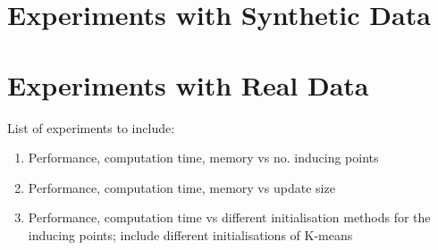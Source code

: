 \section{Experiments with Synthetic Data}\label{sec:synth}
\section{Experiments with Real Data}\label{sec:real}

List of experiments to include:
\begin{enumerate}
\item Performance, computation time, memory vs no. inducing points
\item Performance, computation time, memory vs update size
\item Performance, computation time vs different initialisation methods for the inducing points; include different initialisations of K-means
\end{enumerate}
